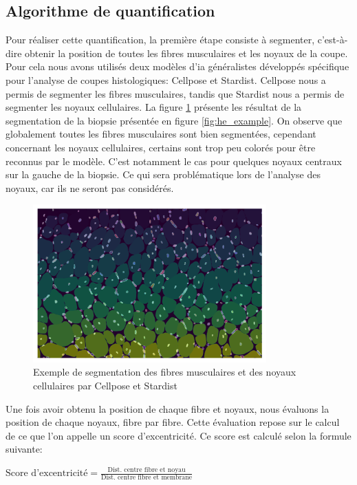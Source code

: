 \subsection{Algorithme de quantification}
Pour réaliser cette quantification, la première étape consiste à segmenter, c'est-à-dire obtenir la position de toutes les fibres musculaires et les noyaux de la coupe. Pour cela nous avons utilisés deux modèles d'\gls{ia} généralistes développés spécifique pour l'analyse de coupes histologiques: Cellpose et Stardist. Cellpose nous a permis de segmenter les fibres musculaires, tandis que Stardist nous a permis de segmenter les noyaux cellulaires. La figure \ref{fig:he_seg} présente les résultat de la segmentation de la biopsie présentée en figure \ref{fig:he_example}. On observe que globalement toutes les fibres musculaires sont bien segmentées, cependant concernant les noyaux cellulaires, certains sont trop peu colorés pour être reconnus par le modèle. C'est notamment le cas pour quelques noyaux centraux sur la gauche de la biopsie. Ce qui sera problématique lors de l'analyse des noyaux, car ils ne seront pas considérés.
\begin{figure}[htbp]
 \centering
 \includegraphics[width=0.8\textwidth]{figures/he_seg.png}
 \caption[Exemple de segmentation de biopsie par Cellpose et Stardist]{Exemple de segmentation des fibres musculaires et des noyaux cellulaires par Cellpose et Stardist}
 \label{fig:he_seg}
\end{figure}

Une fois avoir obtenu la position de chaque fibre et noyaux, nous évaluons la position de chaque noyaux, fibre par fibre. Cette évaluation repose sur le calcul de ce que l'on appelle un score d'excentricité. Ce score est calculé selon la formule suivante:

\(\text{Score d'excentricité} = \frac{\text{Dist. centre fibre et noyau}}{\text{Dist. centre fibre et membrane}}\)

